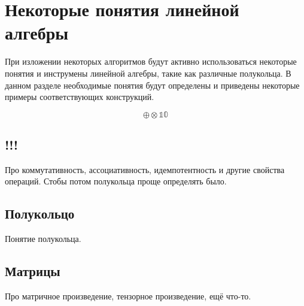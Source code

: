 \chapter{Некоторые понятия линейной алгебры}

При изложении некоторых алгоритмов будут активно использоваться некоторые понятия и инструмены линейной алгебры, такие как различные полукольца.
В данном разделе необходимые понятия будут определены и приведены некоторые примеры соответствующих конструкций.

$$
\oplus
\otimes
\mathbb{1}
\mathbb{0}
$$

\section{!!!}
Про коммутативность, ассоциативность, идемпотентность и другие свойства операций.
Стобы потом полукольца проще определять было.


\section{Полукольцо}
Понятие полукольца.

\section{Матрицы}
Про матричное произведение, тензорное произведение, ещё что-то.